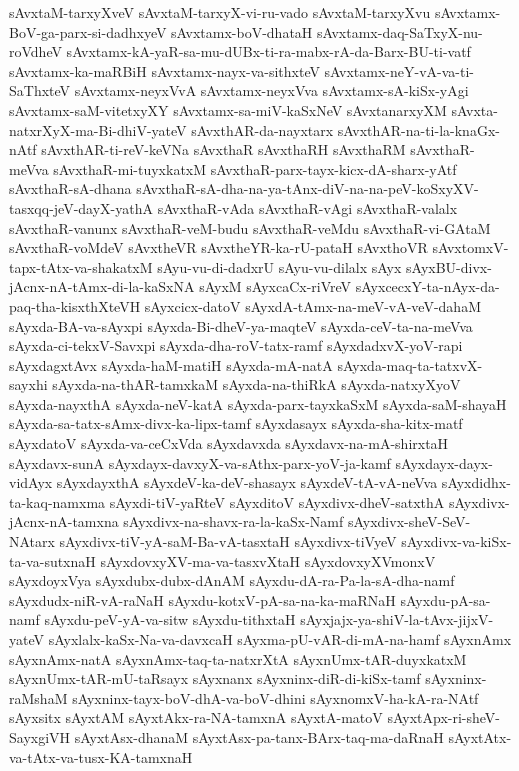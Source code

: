 {sAvxtaM-tarxyXveV
sAvxtaM-tarxyX-vi-ru-vado
sAvxtaM-tarxyXvu
sAvxtamx-BoV-ga-parx-si-dadhxyeV
sAvxtamx-boV-dhataH
sAvxtamx-daq-SaTxyX-nu-roVdheV
sAvxtamx-kA-yaR-sa-mu-dUBx-ti-ra-mabx-rA-da-Barx-BU-ti-vatf
sAvxtamx-ka-maRBiH
sAvxtamx-nayx-va-sithxteV
sAvxtamx-neY-vA-va-ti-SaThxteV
sAvxtamx-neyxVvA
sAvxtamx-neyxVva
sAvxtamx-sA-kiSx-yAgi
sAvxtamx-saM-vitetxyXY
sAvxtamx-sa-miV-kaSxNeV
sAvxtanarxyXM
sAvxta-natxrXyX-ma-Bi-dhiV-yateV
sAvxthAR-da-nayxtarx
sAvxthAR-na-ti-la-knaGx-nAtf
sAvxthAR-ti-reV-keVNa
sAvxthaR
sAvxthaRH
sAvxthaRM
sAvxthaR-meVva
sAvxthaR-mi-tuyxkatxM
sAvxthaR-parx-tayx-kicx-dA-sharx-yAtf
sAvxthaR-sA-dhana
sAvxthaR-sA-dha-na-ya-tAnx-diV-na-na-peV-koSxyXV-tasxqq-jeV-dayX-yathA
sAvxthaR-vAda
sAvxthaR-vAgi
sAvxthaR-valalx
sAvxthaR-vanunx
sAvxthaR-veM-budu
sAvxthaR-veMdu
sAvxthaR-vi-GAtaM
sAvxthaR-voMdeV
sAvxtheVR
sAvxtheYR-ka-rU-pataH
sAvxthoVR
sAvxtomxV-tapx-tAtx-va-shakatxM
sAyu-vu-di-dadxrU
sAyu-vu-dilalx
sAyx
sAyxBU-divx-jAcnx-nA-tAmx-di-la-kaSxNA
sAyxM
sAyxcaCx-riVreV
sAyxcecxY-ta-nAyx-da-paq-tha-kisxthXteVH
sAyxcicx-datoV
sAyxdA-tAmx-na-meV-vA-veV-dahaM
sAyxda-BA-va-sAyxpi
sAyxda-Bi-dheV-ya-maqteV
sAyxda-ceV-ta-na-meVva
sAyxda-ci-tekxV-Savxpi
sAyxda-dha-roV-tatx-ramf
sAyxdadxvX-yoV-rapi
sAyxdagxtAvx
sAyxda-haM-matiH
sAyxda-mA-natA
sAyxda-maq-ta-tatxvX-sayxhi
sAyxda-na-thAR-tamxkaM
sAyxda-na-thiRkA
sAyxda-natxyXyoV
sAyxda-nayxthA
sAyxda-neV-katA
sAyxda-parx-tayxkaSxM
sAyxda-saM-shayaH
sAyxda-sa-tatx-sAmx-divx-ka-lipx-tamf
sAyxdasayx
sAyxda-sha-kitx-matf
sAyxdatoV
sAyxda-va-ceCxVda
sAyxdavxda
sAyxdavx-na-mA-shirxtaH
sAyxdavx-sunA
sAyxdayx-davxyX-va-sAthx-parx-yoV-ja-kamf
sAyxdayx-dayx-vidAyx
sAyxdayxthA
sAyxdeV-ka-deV-shasayx
sAyxdeV-tA-vA-neVva
sAyxdidhx-ta-kaq-namxma
sAyxdi-tiV-yaRteV
sAyxditoV
sAyxdivx-dheV-satxthA
sAyxdivx-jAcnx-nA-tamxna
sAyxdivx-na-shavx-ra-la-kaSx-Namf
sAyxdivx-sheV-SeV-NAtarx
sAyxdivx-tiV-yA-saM-Ba-vA-tasxtaH
sAyxdivx-tiVyeV
sAyxdivx-va-kiSx-ta-va-sutxnaH
sAyxdovxyXV-ma-va-tasxvXtaH
sAyxdovxyXVmonxV
sAyxdoyxVya
sAyxdubx-dubx-dAnAM
sAyxdu-dA-ra-Pa-la-sA-dha-namf
sAyxdudx-niR-vA-raNaH
sAyxdu-kotxV-pA-sa-na-ka-maRNaH
sAyxdu-pA-sa-namf
sAyxdu-peV-yA-va-sitw
sAyxdu-tithxtaH
sAyxjajx-ya-shiV-la-tAvx-jijxV-yateV
sAyxlalx-kaSx-Na-va-davxcaH
sAyxma-pU-vAR-di-mA-na-hamf
sAyxnAmx
sAyxnAmx-natA
sAyxnAmx-taq-ta-natxrXtA
sAyxnUmx-tAR-duyxkatxM
sAyxnUmx-tAR-mU-taRsayx
sAyxnanx
sAyxninx-diR-di-kiSx-tamf
sAyxninx-raMshaM
sAyxninx-tayx-boV-dhA-va-boV-dhini
sAyxnomxV-ha-kA-ra-NAtf
sAyxsitx
sAyxtAM
sAyxtAkx-ra-NA-tamxnA
sAyxtA-matoV
sAyxtApx-ri-sheV-SayxgiVH
sAyxtAsx-dhanaM
sAyxtAsx-pa-tanx-BArx-taq-ma-daRnaH
sAyxtAtx-va-tAtx-va-tusx-KA-tamxnaH
}

